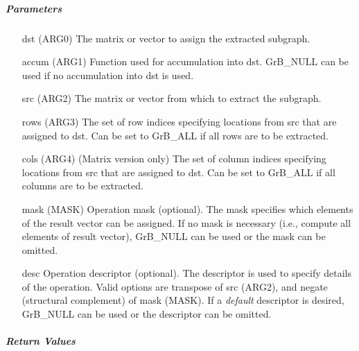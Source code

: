 \subparagraph{Parameters}

\begin{itemize}[leftmargin=1in]
	\item[{\sf dst (ARG0)}]   The matrix or vector to assign the extracted subgraph.
	\item[{\sf accum (ARG1)}] Function used for accumulation into dst.  {\sf GrB\_NULL}
                              can be used if no accumulation into dst is used.
	\item[{\sf src} (ARG2)]   The matrix or vector from which to extract the subgraph.
	\item[{\sf rows} (ARG3)]  The set of row indices specifying locations from src that
                              are assigned to dst. Can
                              be set to {\sf GrB\_ALL} if all rows are
                              to be extracted.
	\item[{\sf cols} (ARG4)]  (Matrix version only) The set of column indices specifying
                              locations from src that are assigned to dst. Can
                              be set to {\sf GrB\_ALL} if all columns are
                              to be extracted.

	\item[{\sf mask} (MASK)]  Operation mask (optional). The mask
	specifies which elements of the result vector can be assigned.
	If no mask is necessary (i.e., compute all elements of result
	vector), {\sf GrB\_NULL} can be used or the mask can be omitted.

	\item[{\sf desc}] Operation descriptor (optional). The descriptor
    is used to specify details of the operation. Valid options are transpose
    of src ({\sf ARG2}), and negate (structural complement) of mask ({\sf MASK}). If
    a \emph{default} descriptor is desired,	{\sf GrB\_NULL} can be
    used or the descriptor can be omitted. 
\end{itemize}

\subparagraph{Return Values}


